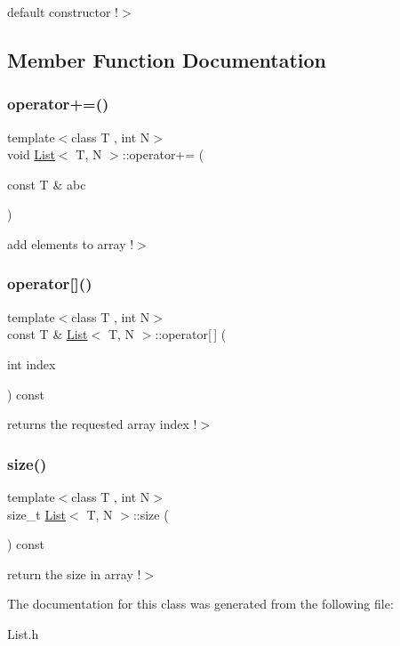 default constructor !$>$ 

\subsection{Member Function Documentation}
\mbox{\label{class_list_aacf615b290fa4f7f751ac892c9010fcb}} 
\subsubsection{\texorpdfstring{operator+=()}{operator+=()}}
{\footnotesize\ttfamily template$<$class T , int N$>$ \\
void \mbox{\hyperlink{class_list}{List}}$<$ T, N $>$\+::operator+= (\begin{DoxyParamCaption}\item[{const T \&}]{abc }\end{DoxyParamCaption})}

add elements to array !$>$ \mbox{\label{class_list_a12605d114dc1737f8bed98f382a7f0ae}} 
\subsubsection{\texorpdfstring{operator[]()}{operator[]()}}
{\footnotesize\ttfamily template$<$class T , int N$>$ \\
const T \& \mbox{\hyperlink{class_list}{List}}$<$ T, N $>$\+::operator\mbox{[}$\,$\mbox{]} (\begin{DoxyParamCaption}\item[{int}]{index }\end{DoxyParamCaption}) const}

returns the requested array index !$>$ \mbox{\label{class_list_aeda8adf8979a5c0b772b320d2025d97c}} 
\subsubsection{\texorpdfstring{size()}{size()}}
{\footnotesize\ttfamily template$<$class T , int N$>$ \\
size\+\_\+t \mbox{\hyperlink{class_list}{List}}$<$ T, N $>$\+::size (\begin{DoxyParamCaption}{ }\end{DoxyParamCaption}) const}

return the size in array !$>$ 

The documentation for this class was generated from the following file\+:\begin{DoxyCompactItemize}
\item 
List.\+h\end{DoxyCompactItemize}
